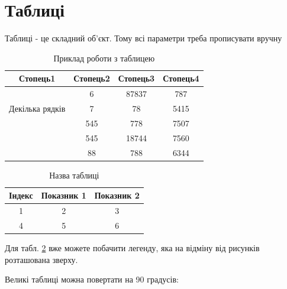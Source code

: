 \section{Таблиці}
Таблиці  - це складний об'єкт. Тому всі параметри треба прописувати вручну

\begin{table}[h!]
\centering
\begin{tabular}{|c|c|c|c|} 
 \hline
 Стопець1 & Стопець2 & Стопець3 & Стопець4 \\ [0.5ex] 
 \hline
 \multirow{3}{5em}{Декілька рядків} & 6 & 87837 & 787 \\ 
  &  7 & 78 & 5415 \\
   & 545 & 778 & 7507 \\
   & 545 & 18744 & 7560 \\
   & 88 & 788 & 6344 \\ [1ex] 
 \hline
\end{tabular}
\caption{Приклад роботи з таблицею}
\label{table:1}
\end{table}


\begin{table}[h]
\caption{\label{table:label}Назва таблиці}
\begin{tabular}{|c|c|c|}
\hline 
Індекс & Показник 1 & Показник 2 \\
\hline\hline 
1 & 2 & 3 \\
\hline 
4 & 5 & 6 \\
\hline 
\end{tabular}
\end{table}

Для табл. \ref{table:label} вже можете побачити легенду, яка на відміну від рисунків розташована зверху.

Великі таблиці можна повертати на 90 градусів:


